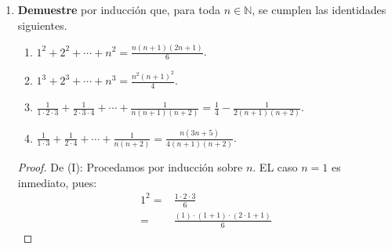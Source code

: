\documentclass[12pt]{article}
\begin{document}
\begin{enumerate}
\begin{proof}
\begin{itemize}
\begin{equation*}
\begin{split}
                    =&\frac{(n+1)^2a^n+a^{n+1}}{(n+1)^{n+1}}\\
                    =&\frac{a^n[(n+1)^2+a]}{(n+1)^{n+1}}\\
                \end{split}
            \end{equation*}
            Por tanto como $a^n\geq0$ y $(n+1)^2+a\geq (n+1)^2-1\geq(1+1)^2-1=3\geq0$, se tiene entonces que
            \begin{equation*}
                \sum_{k=2}^{n+1}{n+1 \choose k}\left(\frac{a}{n+1}\right)^k\geq0
            \end{equation*}
            Lo cual prueba el resultado. Aplicando inducción se tiene que se cumple para todo $m\geq2$. De esta forma, por el sí y sólo si anterior se sigue que
            \begin{equation*}
                \sqrt[m]{1+a}\leq 1+\frac{a}{m}
            \end{equation*}
            para todo $m\in\mathbb{N}$.
        \end{itemize}
        \qed
    \end{proof}
    \item \textbf{Demuestre} por inducción que, para toda $n\in\mathbb{N}$, se cumplen las identidades siguientes.
    \begin{enumerate}
        \item $1^2+2^2+\cdots+n^2=\frac{n\left(n+1\right)\left(2n+1\right)}{6}$.
        \item $1^3+2^3+\cdots+n^3=\frac{n^2\left(n+1\right)^2}{4}$.
        \item $\frac{1}{1\cdot2\cdot3}+\frac{1}{2\cdot3\cdot4}+\cdots+\frac{1}{n\left(n+1\right)\left(n+2\right)}=\frac{1}{4}-\frac{1}{2\left(n+1\right)\left(n+2\right)}$.
        \item $\frac{1}{1\cdot3}+\frac{1}{2\cdot4}+\cdots+\frac{1}{n\left(n+2\right)}=\frac{n\left(3n+5\right)}{4\left(n+1\right)\left(n+2\right)}$.
    \end{enumerate}
    \begin{proof}
        De (I): Procedamos por inducción sobre $n$. EL caso $n=1$ es inmediato, pues:
        \begin{equation*}
            \begin{split}
                1^2=&\frac{1\cdot2\cdot3}{6}\\
                =&\frac{(1)\cdot(1+1)\cdot(2\cdot1+1)}{6}
            \end{split}
        \end{equation*}

\end{proof}
\end{enumerate}
\end{document}
